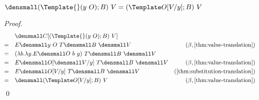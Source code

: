 \begin{lemma}
  \label{thm:template-self}
  $\den{(\Template{} (y ~ O); B) ~ V = (\Template O\subst{y}{V}; B) ~ V}$
\end{lemma}
\begin{proof}
  \begin{align*}
    &\quad
    \den{C[(\Template{} (y ~ O); B) ~ V]}
    \\
    =&\quad
    E\den{y ~ O} ~ T\den{B} ~ \den{V}
    &(\beta, \cref{thm:value-translation})
    \\
    =&\quad
    (\lambda b. \lambda y. E\den{O} ~ b ~ y) ~ T\den{B} ~ \den{V}
    \\
    =&\quad
    E\den{O}\subst{y}{\den{V}} ~ T\den{B} ~ \den{V}
    &(\beta, \cref{thm:value-translation})
    \\
    =&\quad
    E\den{O\subst{y}{V}} ~ T\den{B} ~ \den{V}
    &(\cref{thm:substitution-translation})
    \\
    =&\quad
    \den{(\Template O\subst{y}{V}; B) ~ V}
    &(\beta, \cref{thm:value-translation})
  \end{align*}
  \qed
\end{proof}
  

